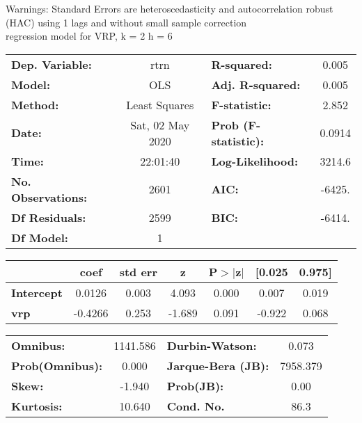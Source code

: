Warnings: \newline
 [1] Standard Errors are heteroscedasticity and autocorrelation robust (HAC) using 1 lags and without small sample correction\\ 

regression model for VRP, k = 2 h = 6\begin{center}
\begin{tabular}{lclc}
\toprule
\textbf{Dep. Variable:}    &       rtrn       & \textbf{  R-squared:         } &     0.005   \\
\textbf{Model:}            &       OLS        & \textbf{  Adj. R-squared:    } &     0.005   \\
\textbf{Method:}           &  Least Squares   & \textbf{  F-statistic:       } &     2.852   \\
\textbf{Date:}             & Sat, 02 May 2020 & \textbf{  Prob (F-statistic):} &   0.0914    \\
\textbf{Time:}             &     22:01:40     & \textbf{  Log-Likelihood:    } &    3214.6   \\
\textbf{No. Observations:} &        2601      & \textbf{  AIC:               } &    -6425.   \\
\textbf{Df Residuals:}     &        2599      & \textbf{  BIC:               } &    -6414.   \\
\textbf{Df Model:}         &           1      & \textbf{                     } &             \\
\bottomrule
\end{tabular}
\begin{tabular}{lcccccc}
                   & \textbf{coef} & \textbf{std err} & \textbf{z} & \textbf{P$> |$z$|$} & \textbf{[0.025} & \textbf{0.975]}  \\
\midrule
\textbf{Intercept} &       0.0126  &        0.003     &     4.093  &         0.000        &        0.007    &        0.019     \\
\textbf{vrp}       &      -0.4266  &        0.253     &    -1.689  &         0.091        &       -0.922    &        0.068     \\
\bottomrule
\end{tabular}
\begin{tabular}{lclc}
\textbf{Omnibus:}       & 1141.586 & \textbf{  Durbin-Watson:     } &    0.073  \\
\textbf{Prob(Omnibus):} &   0.000  & \textbf{  Jarque-Bera (JB):  } & 7958.379  \\
\textbf{Skew:}          &  -1.940  & \textbf{  Prob(JB):          } &     0.00  \\
\textbf{Kurtosis:}      &  10.640  & \textbf{  Cond. No.          } &     86.3  \\
\bottomrule
\end{tabular}
\end{center}


